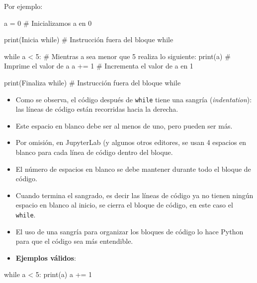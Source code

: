 \documentclass[
  letterpaper,
  DIV=11,
  numbers=noendperiod]{scrreprt}
\newenvironment{Shaded}{\begin{snugshade}}{\end{snugshade}}
\newcommand{\BuiltInTok}[1]{\textcolor[rgb]{0.00,0.23,0.31}{#1}}
\newcommand{\CommentTok}[1]{\textcolor[rgb]{0.37,0.37,0.37}{#1}}
\newcommand{\ControlFlowTok}[1]{\textcolor[rgb]{0.00,0.23,0.31}{#1}}
\newcommand{\DecValTok}[1]{\textcolor[rgb]{0.68,0.00,0.00}{#1}}
\newcommand{\NormalTok}[1]{\textcolor[rgb]{0.00,0.23,0.31}{#1}}
\newcommand{\OperatorTok}[1]{\textcolor[rgb]{0.37,0.37,0.37}{#1}}
\newcommand{\StringTok}[1]{\textcolor[rgb]{0.13,0.47,0.30}{#1}}
\begin{document}
Por ejemplo:

\begin{Shaded}
\begin{Highlighting}[]
\NormalTok{a }\OperatorTok{=} \DecValTok{0} \CommentTok{\# Inicializamos a en 0}

\BuiltInTok{print}\NormalTok{(}\StringTok{\textquotesingle{}Inicia while\textquotesingle{}}\NormalTok{) }\CommentTok{\# Instrucción fuera del bloque while}

\ControlFlowTok{while}\NormalTok{ a }\OperatorTok{\textless{}} \DecValTok{5}\NormalTok{: }\CommentTok{\# Mientras a sea menor que 5 realiza lo siguiente:}
    \BuiltInTok{print}\NormalTok{(a) }\CommentTok{\# Imprime el valor de a}
\NormalTok{    a }\OperatorTok{+=} \DecValTok{1}   \CommentTok{\# Incrementa el valor de a en 1}
    
\BuiltInTok{print}\NormalTok{(}\StringTok{\textquotesingle{}Finaliza while\textquotesingle{}}\NormalTok{)  }\CommentTok{\# Instrucción fuera del bloque while}
\end{Highlighting}
\end{Shaded}

\begin{itemize}
\item
  Como se observa, el código después de \texttt{while} tiene una sangría
  (\emph{indentation}): las líneas de código están recorridas hacia la
  derecha.
\item
  Este espacio en blanco debe ser al menos de uno, pero pueden ser más.
\item
  Por omisión, en JupyterLab (y algunos otros editores, se usan 4
  espacios en blanco para cada línea de código dentro del bloque.
\item
  El número de espacios en blanco se debe mantener durante todo el
  bloque de código.
\item
  Cuando termina el sangrado, es decir las líneas de código ya no tienen
  ningún espacio en blanco al inicio, se cierra el bloque de código, en
  este caso el \texttt{while}.
\item
  El uso de una sangría para organizar los bloques de código lo hace
  Python para que el código sea más entendible.
\item
  \textbf{Ejemplos válidos}:
\end{itemize}

\begin{Shaded}
\begin{Highlighting}[]
\ControlFlowTok{while}\NormalTok{ a }\OperatorTok{\textless{}} \DecValTok{5}\NormalTok{: }
 \BuiltInTok{print}\NormalTok{(a)}
\NormalTok{ a }\OperatorTok{+=} \DecValTok{1}
\end{Highlighting}
\end{Shaded}
\end{document}
